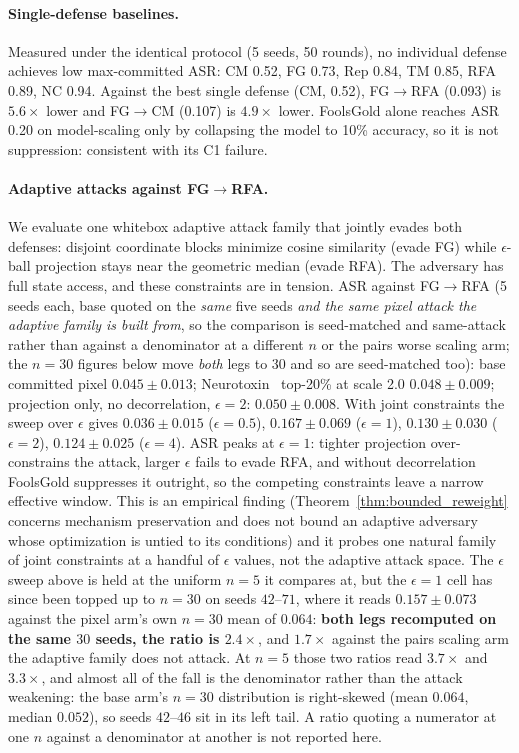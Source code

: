 \documentclass{article}
\begin{document}
\paragraph{Single-defense baselines.} Measured under the identical protocol (5 seeds, 50 rounds), no individual defense achieves low max-committed ASR: CM 0.52, FG 0.73, Rep 0.84, TM 0.85, RFA 0.89, NC 0.94. Against the best single defense (CM, 0.52), FG$\to$RFA (0.093) is $5.6\times$ lower and FG$\to$CM (0.107) is $4.9\times$ lower. FoolsGold alone reaches ASR 0.20 on model-scaling only by collapsing the model to 10\% accuracy, so it is not suppression: consistent with its C1 failure.

\paragraph{Adaptive attacks against FG$\to$RFA.} We evaluate one whitebox adaptive attack family that jointly evades both defenses: disjoint coordinate blocks minimize cosine similarity (evade FG) while $\epsilon$-ball projection stays near the geometric median (evade RFA). The adversary has full state access, and these constraints are in tension. ASR against FG$\to$RFA (5 seeds each, base quoted on the \emph{same} five seeds \emph{and the same pixel attack the adaptive family is built from}, so the comparison is seed-matched and same-attack rather than against a denominator at a different $n$ or the pairs worse scaling arm; the $n{=}30$ figures below move \emph{both} legs to $30$ and so are seed-matched too): base committed pixel $0.045 \pm 0.013$; Neurotoxin~\citep{zhang2022neurotoxin} top-20\% at scale 2.0 $0.048 \pm 0.009$; projection only, no decorrelation, $\epsilon{=}2$: $0.050 \pm 0.008$. With joint constraints the sweep over $\epsilon$ gives $0.036 \pm 0.015$ ($\epsilon{=}0.5$), $\mathbf{0.167 \pm 0.069}$ ($\epsilon{=}1$), $0.130 \pm 0.030$ ($\epsilon{=}2$), $0.124 \pm 0.025$ ($\epsilon{=}4$). ASR peaks at $\epsilon{=}1$: tighter projection over-constrains the attack, larger $\epsilon$ fails to evade RFA, and without decorrelation FoolsGold suppresses it outright, so the competing constraints leave a narrow effective window. This is an empirical finding (Theorem~\ref{thm:bounded_reweight} concerns mechanism preservation and does not bound an adaptive adversary whose optimization is untied to its conditions) and it probes one natural family of joint constraints at a handful of $\epsilon$ values, not the adaptive attack space. The $\epsilon$ sweep above is held at the uniform $n{=}5$ it compares at, but the $\epsilon{=}1$ cell has since been topped up to $n{=}30$ on seeds $42$--$71$, where it reads $0.157 \pm 0.073$ against the pixel arm's own $n{=}30$ mean of $0.064$: \textbf{both legs recomputed on the same $30$ seeds, the ratio is $2.4\times$}, and $1.7\times$ against the pairs scaling arm the adaptive family does not attack. At $n{=}5$ those two ratios read $3.7\times$ and $3.3\times$, and almost all of the fall is the denominator rather than the attack weakening: the base arm's $n{=}30$ distribution is right-skewed (mean $0.064$, median $0.052$), so seeds $42$--$46$ sit in its left tail. A ratio quoting a numerator at one $n$ against a denominator at another is not reported here.
\end{document}

